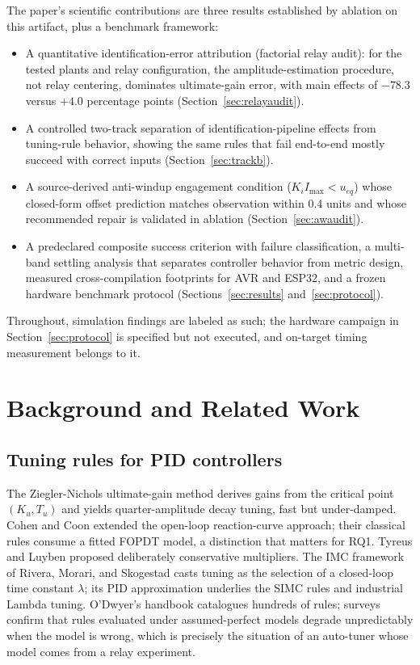 \documentclass[10pt,twocolumn]{article}
\begin{document}
The paper's scientific contributions are three results established by ablation on this artifact, plus a benchmark framework:

\begin{itemize}
\item A quantitative identification-error attribution (factorial relay audit): for the tested plants and relay configuration, the amplitude-estimation procedure, not relay centering, dominates ultimate-gain error, with main effects of $-78.3$ versus $+4.0$ percentage points (Section~\ref{sec:relayaudit}).
\item A controlled two-track separation of identification-pipeline effects from tuning-rule behavior, showing the same rules that fail end-to-end mostly succeed with correct inputs (Section~\ref{sec:trackb}).
\item A source-derived anti-windup engagement condition ($K_i I_{\max} < u_{eq}$) whose closed-form offset prediction matches observation within 0.4 units and whose recommended repair is validated in ablation (Section~\ref{sec:awaudit}).
\item A predeclared composite success criterion with failure classification, a multi-band settling analysis that separates controller behavior from metric design, measured cross-compilation footprints for AVR and ESP32, and a frozen hardware benchmark protocol (Sections~\ref{sec:results} and~\ref{sec:protocol}).
\end{itemize}

Throughout, simulation findings are labeled as such; the hardware campaign in Section~\ref{sec:protocol} is specified but not executed, and on-target timing measurement belongs to it.

\section{Background and Related Work}

\subsection{Tuning rules for PID controllers}

The Ziegler-Nichols ultimate-gain method \cite{ziegler1942} derives gains from the critical point $(K_u, T_u)$ and yields quarter-amplitude decay tuning, fast but under-damped. Cohen and Coon \cite{cohen1953} extended the open-loop reaction-curve approach; their classical rules consume a fitted FOPDT model, a distinction that matters for RQ1. Tyreus and Luyben \cite{tyreus1992} proposed deliberately conservative multipliers. The IMC framework of Rivera, Morari, and Skogestad \cite{rivera1986} casts tuning as the selection of a closed-loop time constant $\lambda$; its PID approximation underlies the SIMC rules \cite{skogestad2003, skogestad2012} and industrial Lambda tuning. O'Dwyer's handbook \cite{odwyer2006} catalogues hundreds of rules; surveys \cite{astrom2006, borase2021} confirm that rules evaluated under assumed-perfect models degrade unpredictably when the model is wrong, which is precisely the situation of an auto-tuner whose model comes from a relay experiment.
\end{document}
